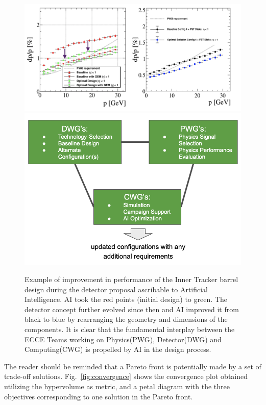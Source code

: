 \begin{figure}[!]
    \centering
    \includegraphics[scale = 0.25]{figs/improve_with_AI.png}
    \includegraphics[scale = 0.35]{figs/interplay.png}
    \caption{
    Example of improvement in performance of the Inner Tracker barrel design during the detector proposal ascribable to Artificial Intelligence. AI took the red points (initial design) to green. The detector concept further evolved since then and AI improved it from black to blue by rearranging the geometry and dimensions of the components. It is clear that the fundamental interplay between the ECCE Teams working on Physics(PWG), Detector(DWG) and Computing(CWG) is propelled by AI in the design process. 
}
    \label{fig:improved_with_AI}
\end{figure}

The reader should be reminded that a Pareto front is potentially made by a set of trade-off solutions. Fig.~\ref{fig:convergence} shows the convergence plot obtained utilizing the hypervolume as metric, and a petal diagram with the three objectives corresponding to one solution in the Pareto front. 

